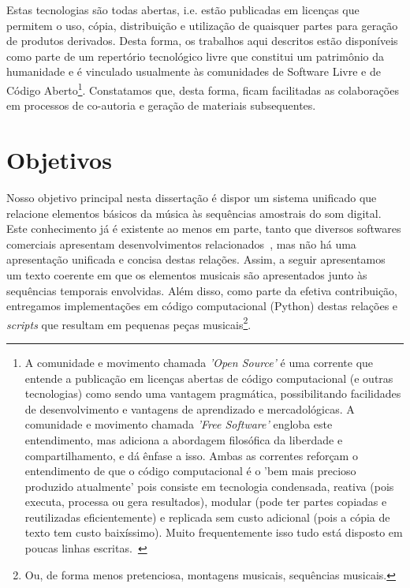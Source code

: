 Estas tecnologias são todas abertas, i.e. estão publicadas em licenças que permitem o uso, cópia, distribuição e utilização de quaisquer partes para geração de produtos derivados. Desta forma, os trabalhos aqui descritos estão disponíveis como parte de um repertório tecnológico livre que constitui um patrimônio da humanidade e é vinculado usualmente às comunidades de Software Livre e de Código Aberto\footnote{A comunidade e movimento chamada \emph{'Open Source'} é uma corrente que entende a publicação em licenças abertas de código computacional (e outras tecnologias) como sendo uma vantagem pragmática, possibilitando facilidades de desenvolvimento e vantagens de aprendizado e mercadológicas. A comunidade e movimento chamada \emph{'Free Software'} engloba este entendimento, mas adiciona a abordagem filosófica da liberdade e compartilhamento, e dá ênfase a isso. Ambas as correntes reforçam o entendimento de que o código computacional é o 'bem mais  precioso produzido atualmente' pois consiste em tecnologia condensada, reativa (pois executa, processa ou gera resultados), modular (pode ter partes copiadas e reutilizadas eficientemente) e replicada sem custo adicional (pois a cópia de texto tem custo baixíssimo). Muito frequentemente isso tudo está disposto em poucas linhas escritas.~\cite{Raymond,Lessig}}. Constatamos que, desta forma, ficam facilitadas as colaborações em processos de co-autoria e geração de materiais subsequentes.

    \section{Objetivos}
   \label{sec:objetivos}
Nosso objetivo principal nesta dissertação é dispor um sistema unificado que relacione elementos básicos da música às sequências amostrais do som digital. Este conhecimento já é existente ao menos em parte, tanto que diversos softwares comerciais apresentam desenvolvimentos relacionados~\cite{Steinberg, Waves, Sony}, mas não há uma apresentação unificada e concisa destas relações. Assim, a seguir apresentamos um texto coerente em que os elementos musicais são apresentados junto às sequências temporais envolvidas. Além disso, como parte da efetiva contribuição, entregamos implementações em código computacional (Python) destas relações e \emph{scripts} que resultam em pequenas peças musicais\footnote{Ou, de forma menos pretenciosa, montagens musicais, sequências musicais.}. 


